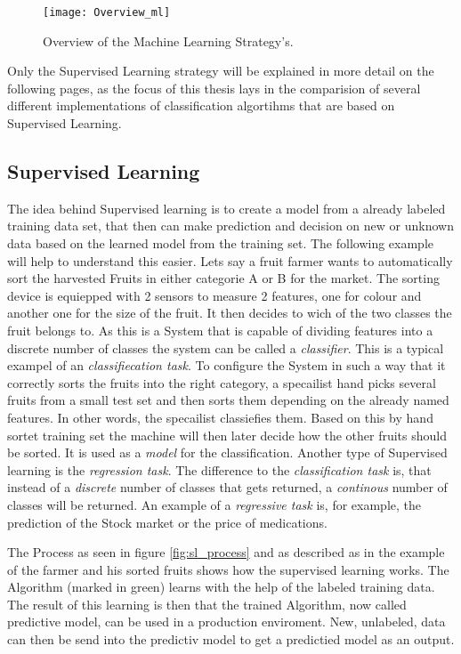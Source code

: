\documentclass[12pt,oneside,a4paper,parskip]{scrbook}
\begin{document}
\begin{figure}
  \texttt{[image: Overview\_ml]}
  \caption{Overview of the Machine Learning Strategy's.}
  \label{fig:overview_ML}
\end{figure}

Only the Supervised Learning strategy will be explained in more detail on the following pages, as the focus of this 
thesis lays in the comparision of several different implementations of classification algortihms that are based on 
Supervised Learning.
 

\cite{IntroML}

\subsection{Supervised Learning}

The idea behind Supervised learning is to create a model from a already labeled training data set, that then can make 
prediction and decision on new or unknown data based on the learned model from the training set. 
The following example will help to understand this easier.
Lets say a fruit farmer wants to automatically sort the harvested Fruits in either categorie A or B for the market. 
The sorting device is equiepped with 2 sensors to measure 2 features, one for colour and another one for the size of the 
fruit. It then decides to wich of the two classes the fruit belongs to. As this is a System that is capable of dividing 
features into a discrete number of classes the system can be called a \textit{classifier}. 
This is a typical exampel of an \textit{classifiecation task}.
To configure the System in such a way that it correctly sorts the fruits into the right category, 
a specailist hand picks several fruits from a small test set and then sorts them depending on the already named features. 
In other words, the specailist classiefies them. Based on this by hand sortet training set the machine will then later 
decide how the other fruits should be sorted. It is used as a \textit{model} for the classification. \cite{IntroAI}
Another type of Supervised learning is the \textit{regression task}. The difference to the \textit{classification task} is, 
that instead of a \textit{discrete} number of classes that gets returned, a \textit{continous} number of classes will be 
returned. An example of a \textit{regressive task} is, for example, the prediction of the Stock market or the price of 
medications.

The Process as seen in figure \ref{fig:sl_process} and as described as in the example of the farmer and his sorted 
fruits shows how the supervised learning works. The Algorithm (marked in green) learns with the help of the labeled 
training data. The result of this learning is then that the trained Algorithm, now called predictive model, 
can be used in a production enviroment.
New, unlabeled, data can then be send into the predictiv model to get a predictied model as an output. \cite{PythonML}
\end{document}
